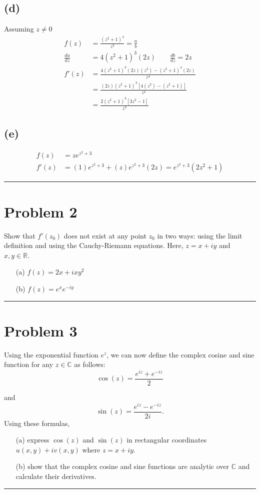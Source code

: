 \documentclass{article}
\newcommand{\der}[2]{\frac{d#1}{d#2}}
\begin{document}
\subsection*{(d)}
Assuming $z\neq 0$
\begin{align*}
	f(z)       & = \frac{(z^2+1)^4}{z^2} = \frac{a}{b}         \\
  \der{a}{z} & = 4(z^2+1)^3(2z)  \quad \quad \der{b}{z} = 2z \\
  f'(z) &= \frac{4(z^2+1)^3(2z)(z^2) - (z^2+1)^4(2z)}{z^4} \\
                   &= \frac{(2z)(z^2+1)^3[4(z^2) - (z^2+1)]}{z^4} \\
  &=\frac{2(z^2+1)^3[3z^2-1]}{z^3}
\end{align*}
\subsection*{(e)}
\begin{align*}
  f(z) &= z e^{z^2 + 3}\\
  f'(z) &= (1)e^{z^2 + 3} + (z)e^{z^2 + 3}(2z) = e^{z^2 + 3}(2z^2 + 1) 
\end{align*}

\hrule %

\newpage
\section*{Problem 2}
Show that $f'(z_0)$ does not exist at any point $z_0$ in two ways: using the limit definition and using the Cauchy-Riemann equations. Here, $z = x + iy$ and $x,y \in \mathbb{R}$.
\begin{enumerate}
	\item[(a)] $f(z) = 2x+ixy^2$
	\item[(b)] $f(z) = e^{x}e^{-iy}$
\end{enumerate}


\vspace{.5cm} %

\hrule

\newpage
\section*{Problem 3}
Using the exponential function $e^{z}$, we can now define the complex cosine and sine function for any $z \in \mathbb{C}$ as follows:
\[  \cos(z) = \frac{e^{iz} + e^{-iz}}{2} \]

and
\[  \sin(z) = \frac{e^{iz} - e^{-iz}}{2i}. \]
Using these formulas,
\begin{enumerate}
	\item[(a)] express $\cos(z)$ and $\sin(z)$ in rectangular coordinates $u(x,y) + iv (x,y)$ where $z = x + iy$.
	\item[(b)] show that the complex cosine and sine functions are analytic over $\mathbb{C}$ and calculate their derivatives.
\end{enumerate}


\vspace{.5cm} %

\hrule

\end{document}
